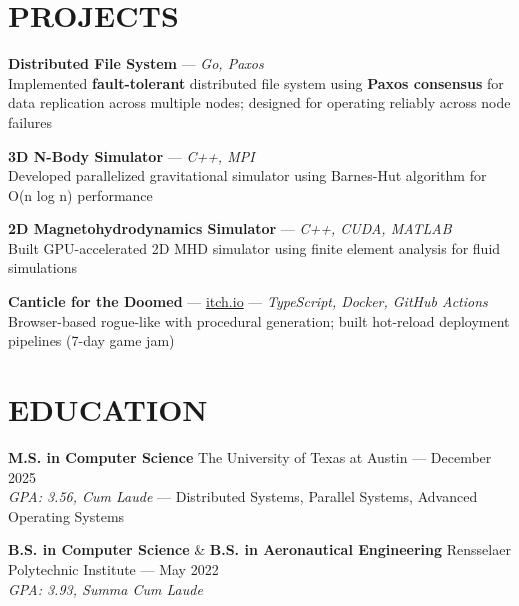 \documentclass{article}
\begin{document}
\section*{PROJECTS}
\textbf{Distributed File System} — \textit{Go, Paxos} \\
Implemented \textbf{fault-tolerant} distributed file system using \textbf{Paxos consensus} for data replication across multiple nodes; designed for operating reliably across node failures

\textbf{3D N-Body Simulator} — \textit{C++, MPI} \\
Developed parallelized gravitational simulator using Barnes-Hut algorithm for O(n log n) performance

\textbf{2D Magnetohydrodynamics Simulator} — \textit{C++, CUDA, MATLAB} \\
Built GPU-accelerated 2D MHD simulator using finite element analysis for fluid simulations

\textbf{Canticle for the Doomed} — \href{https://sve009.itch.io/canticle-for-the-doomed}{itch.io} — \textit{TypeScript, Docker, GitHub Actions} \\
Browser-based rogue-like with procedural generation; built hot-reload deployment pipelines (7-day game jam)

\section*{EDUCATION}
\textbf{M.S. in Computer Science} \hfill The University of Texas at Austin — December 2025 \\
\textit{GPA: 3.56, Cum Laude} — Distributed Systems, Parallel Systems, Advanced Operating Systems

\textbf{B.S. in Computer Science} \& \textbf{B.S. in Aeronautical Engineering} \hfill Rensselaer Polytechnic Institute — May 2022 \\
\textit{GPA: 3.93, Summa Cum Laude}
\end{document}
